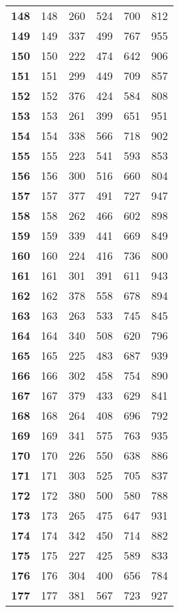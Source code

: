 \begin{longtable}{|l|c|c|c|c|c|}
    \textbf{148} & 148 &260 & 524 & 700 & 812 \\
    \textbf{149} & 149 &337 & 499 & 767 & 955 \\
    \textbf{150} & 150 &222 & 474 & 642 & 906 \\
    \textbf{151} & 151 &299 & 449 & 709 & 857 \\
    \textbf{152} & 152 &376 & 424 & 584 & 808 \\
    \textbf{153} & 153 &261 & 399 & 651 & 951 \\
    \textbf{154} & 154 &338 & 566 & 718 & 902 \\
    \textbf{155} & 155 &223 & 541 & 593 & 853 \\
    \textbf{156} & 156 &300 & 516 & 660 & 804 \\
    \textbf{157} & 157 &377 & 491 & 727 & 947 \\
    \textbf{158} & 158 &262 & 466 & 602 & 898 \\
    \textbf{159} & 159 &339 & 441 & 669 & 849 \\
    \textbf{160} & 160 &224 & 416 & 736 & 800 \\
    \textbf{161} & 161 &301 & 391 & 611 & 943 \\
    \textbf{162} & 162 &378 & 558 & 678 & 894 \\
    \textbf{163} & 163 &263 & 533 & 745 & 845 \\
    \textbf{164} & 164 &340 & 508 & 620 & 796 \\
    \textbf{165} & 165 &225 & 483 & 687 & 939 \\
    \textbf{166} & 166 &302 & 458 & 754 & 890 \\
    \textbf{167} & 167 &379 & 433 & 629 & 841 \\
    \textbf{168} & 168 &264 & 408 & 696 & 792 \\
    \textbf{169} & 169 &341 & 575 & 763 & 935 \\
    \textbf{170} & 170 &226 & 550 & 638 & 886 \\
    \textbf{171} & 171 &303 & 525 & 705 & 837 \\
    \textbf{172} & 172 &380 & 500 & 580 & 788 \\
    \textbf{173} & 173 &265 & 475 & 647 & 931 \\
    \textbf{174} & 174 &342 & 450 & 714 & 882 \\
    \textbf{175} & 175 &227 & 425 & 589 & 833 \\
    \textbf{176} & 176 &304 & 400 & 656 & 784 \\
    \textbf{177} & 177 &381 & 567 & 723 & 927 \\

\end{longtable}
